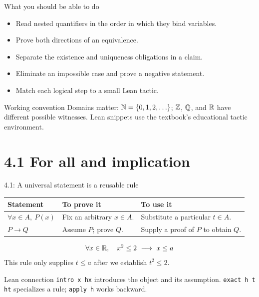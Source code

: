 

\begin{frame}\titlepage\end{frame}

\begin{frame}{What you should be able to do}
\begin{itemize}
\item Read nested quantifiers in the order in which they bind variables.
\item Prove both directions of an equivalence.
\item Separate the existence and uniqueness obligations in a claim.
\item Eliminate an impossible case and prove a negative statement.
\item Match each logical step to a small Lean tactic.
\end{itemize}
\begin{block}{Working convention}
Domains matter: $\mathbb{N}=\{0,1,2,\ldots\}$; $\mathbb{Z}$, $\mathbb{Q}$, and $\mathbb{R}$ have different possible witnesses. Lean snippets use the textbook's educational tactic environment.
\end{block}
\end{frame}

\section{4.1 For all and implication}
\begin{frame}{4.1: A universal statement is a reusable rule}
\begin{center}
\begin{tabular}{p{}p{}p{}}
\toprule
Statement & To prove it & To use it\\\midrule
$\forall x\in A,\ P(x)$ & Fix an arbitrary $x\in A$. & Substitute a particular $t\in A$.\\[2mm]
$P\to Q$ & Assume $P$; prove $Q$. & Supply a proof of $P$ to obtain $Q$.\\\bottomrule
\end{tabular}
\end{center}
\[
\forall x\in\R,\quad x^2\le 2\ \longrightarrow\ x\le a
\]
This rule only supplies $t\le a$ after we establish $t^2\le 2$.
\begin{block}{Lean connection}
\texttt{intro x hx} introduces the object and its assumption.\quad
\texttt{exact h t ht} specializes a rule; \texttt{apply h} works backward.
\end{block}
\end{frame}

